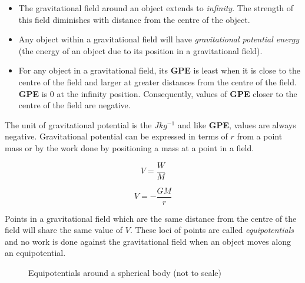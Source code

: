 \documentclass[12pt]{article}
\begin{document}
\begin{itemize}
\item The gravitational field around an object extends to \emph{infinity}. The strength of this field diminishes with distance from the centre of the object.

\item Any object within a gravitational field will have \emph{gravitational potential energy} (the energy of an object due to its position in a gravitational field).

\item For any object in a gravitational field, its \textbf{GPE} is least when it is close to the centre of the field and larger at greater distances from the centre of the field. \textbf{GPE} is \(0\) at the infinity position. Consequently, values of \textbf{GPE} closer to the centre of the field are negative.
\end{itemize}

The unit of gravitational potential is the \(Jkg^{-1}\) and like \textbf{GPE}, values are always negative. Gravitational potential can be expressed in terms of \(r\) from a point mass or by the work done by positioning a mass at a point in a field.

\begin{figure}[H]
\centering
\begin{minipage}{.8\textwidth}
\begin{tcolorbox}[
sharp corners=all,
colback=white,
colframe=white,
size=tight,
boxrule=0.2mm,
left=10mm, right=10mm
]
\begin{multicols}{2}
\[V = \dfrac{W}{M}\]

\columnbreak

\[V = -\dfrac{GM}{r}\]
\end{multicols}
\end{tcolorbox}
\end{minipage}
\end{figure}

Points in a gravitational field which are the same distance from the centre of the field will share the same value of \(V\). These loci of points are called \emph{equipotentials} and no work is done against the gravitational field when an object moves along an equipotential.

\begin{figure}[H]
\centering
{}
\caption{Equipotentials around a spherical body (not to scale)}
\end{figure}
\end{document}
